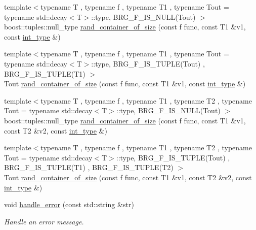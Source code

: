 \begin{DoxyCompactItemize}
\item 
{\footnotesize template$<$typename T , typename f , typename T1 , typename Tout  = typename std\-::decay$<$\-T$>$\-::type, B\-R\-G\-\_\-\-F\-\_\-\-I\-S\-\_\-\-N\-U\-L\-L(\-Tout) $>$ }\\boost\-::tuples\-::null\-\_\-type \hyperlink{namespaceIceBRG_add5eb16ffae5a41b94ba78fcef654034}{rand\-\_\-container\-\_\-of\-\_\-size} (const f func, const T1 \&v1, const \hyperlink{lib_2IceBRG__main_2common_8h_ac4de9d9335536ac22821171deec8d39e}{int\-\_\-type} \&)
\item 
{\footnotesize template$<$typename T , typename f , typename T1 , typename Tout  = typename std\-::decay$<$\-T$>$\-::type, B\-R\-G\-\_\-\-F\-\_\-\-I\-S\-\_\-\-T\-U\-P\-L\-E(\-Tout) , B\-R\-G\-\_\-\-F\-\_\-\-I\-S\-\_\-\-T\-U\-P\-L\-E(\-T1) $>$ }\\Tout \hyperlink{namespaceIceBRG_ab9909381a61dbdafd69115b03725733c}{rand\-\_\-container\-\_\-of\-\_\-size} (const f func, const T1 \&v1, const \hyperlink{lib_2IceBRG__main_2common_8h_ac4de9d9335536ac22821171deec8d39e}{int\-\_\-type} \&)
\item 
{\footnotesize template$<$typename T , typename f , typename T1 , typename T2 , typename Tout  = typename std\-::decay$<$\-T$>$\-::type, B\-R\-G\-\_\-\-F\-\_\-\-I\-S\-\_\-\-N\-U\-L\-L(\-Tout) $>$ }\\boost\-::tuples\-::null\-\_\-type \hyperlink{namespaceIceBRG_a26124be0d6d1a9d551d4470410b450a6}{rand\-\_\-container\-\_\-of\-\_\-size} (const f func, const T1 \&v1, const T2 \&v2, const \hyperlink{lib_2IceBRG__main_2common_8h_ac4de9d9335536ac22821171deec8d39e}{int\-\_\-type} \&)
\item 
{\footnotesize template$<$typename T , typename f , typename T1 , typename T2 , typename Tout  = typename std\-::decay$<$\-T$>$\-::type, B\-R\-G\-\_\-\-F\-\_\-\-I\-S\-\_\-\-T\-U\-P\-L\-E(\-Tout) , B\-R\-G\-\_\-\-F\-\_\-\-I\-S\-\_\-\-T\-U\-P\-L\-E(\-T1) , B\-R\-G\-\_\-\-F\-\_\-\-I\-S\-\_\-\-T\-U\-P\-L\-E(\-T2) $>$ }\\Tout \hyperlink{namespaceIceBRG_aefd19d7a32a95306171961805a41db18}{rand\-\_\-container\-\_\-of\-\_\-size} (const f func, const T1 \&v1, const T2 \&v2, const \hyperlink{lib_2IceBRG__main_2common_8h_ac4de9d9335536ac22821171deec8d39e}{int\-\_\-type} \&)
\item 
void \hyperlink{namespaceIceBRG_af9f5b4e0afa15ed2c2f25f06a66d8fff}{handle\-\_\-error} (const std\-::string \&str)
\begin{DoxyCompactList}\small\item\em Handle an error message. \end{DoxyCompactList}\item 

\end{DoxyCompactItemize}
